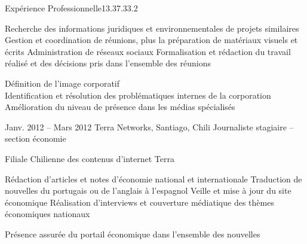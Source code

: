 \documentclass[30pt, french]{tccv}
\begin{document}
\begin{upshape}
\begin{flat_frame}{Expérience Professionnelle}{13.3}{7.3}{3.2}{}
\begin{eventlist}
\setlength{\parskip}{-10pt}
\begin{itemize}
      \setlength\itemsep{-3pt} 
      \cvitem[\checkmark] Recherche des informations juridiques et environnementales de projets similaires          
      \cvitem[\checkmark] Gestion et coordination de réunions, plus la préparation de matériaux visuels et écrits   
      \cvitem[\checkmark] Administration de réseaux sociaux                                                                    
      \cvitem[\checkmark] Formalisation et rédaction du travail réalisé et des décisions pris dans l’ensemble des réunions     
\end{itemize}      

  Définition de l’image corporatif \\
\mission{}            Identification et résolution des problématiques internes de la corporation \\
\mission{} 	      Amélioration du niveau de présence dans les médias spécialisés \\


  
\setlength{\parskip}{0pt}
\item{Janv. 2012 -- Mars 2012 }     
  {Terra Networks, Santiago, Chili}     
  {Journaliste stagiaire – section économie}
  \fontsize{9pt}{1em}\color{text}\bodyfontlight\upshape\selectfont

 Filiale Chilienne des contenus d’internet Terra  \\
  
\setlength{\parskip}{-10pt}
\begin{itemize}
      \setlength\itemsep{-3pt} 
      \cvitem[\checkmark] Rédaction d'articles et notes d’économie national et internationale
      \cvitem[\checkmark] Traduction de nouvelles du portugais ou de l'anglais à l'espagnol
      \cvitem[\checkmark] Veille et mise à jour du site économique
      \cvitem[\checkmark] Réalisation d'interviews et couverture médiatique des thèmes économiques nationaux
\end{itemize}        

 Présence assurée du portail économique dans l’ensemble des nouvelles \\
\mission{}           

   

\end{eventlist}
\end{flat_frame}







\end{upshape}
\end{document}
